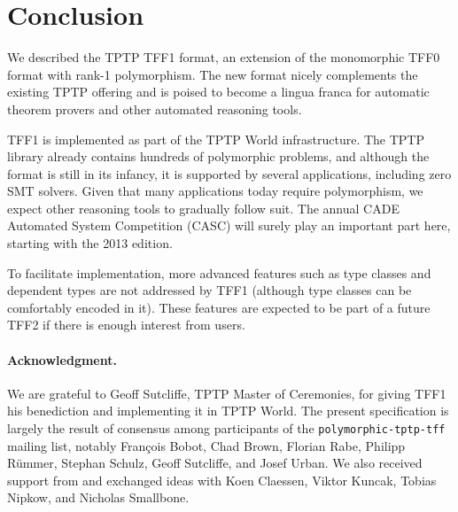 \section{Conclusion}
\label{sec_concl}

We described the TPTP TFF1 format, an extension of the monomorphic TFF0 format
with rank-1 polymorphism. The new format nicely complements the existing TPTP
offering and is poised to become a lingua franca for automatic theorem provers
and other automated reasoning tools.

TFF1 is implemented as part of the TPTP World infrastructure. The TPTP library
already contains hundreds of polymorphic problems, and although the format is
still in its infancy, it is supported by several applications, including zero
SMT solvers. Given that many applications today require polymorphism, we expect
other reasoning tools to gradually follow suit. The annual CADE Automated System
Competition (CASC) will surely play an important part here, starting with the
2013 edition.

To facilitate implementation, more advanced features such as type classes and
dependent types are not addressed by TFF1 (although type classes can be
comfortably encoded in it). These features are expected to be part of a future
TFF2 if there is enough interest from users.

\def\ackname{Acknowledgment}
\paragraph{\textbf{\upshape\ackname.}}
%
We are grateful to Geoff Sutcliffe, TPTP Master of Ceremonies, for giving TFF1
his benediction and %
implementing it in TPTP World. The
present specification is largely the result of consensus among participants of
the {\tt polymorphic-tptp-tff} mailing list, notably Fran\c{c}ois Bobot, Chad
Brown, Florian Rabe, Philipp R\"ummer, Stephan Schulz, Geoff Sutcliffe, and
Josef Urban. We also received support from and exchanged ideas with Koen
Claessen, Viktor Kuncak, Tobias Nipkow, and Nicholas Smallbone.
